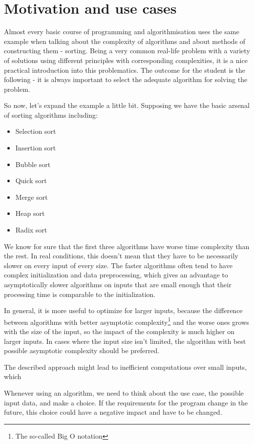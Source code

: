 \chapter{Motivation and use cases}

Almost every basic course of programming and algorithmisation uses the same example when talking about the complexity of algorithms and about methods of constructing them - sorting. Being a very common real-life problem with a variety of solutions using different principles with corresponding complexities, it is a nice practical introduction into this problematics. The outcome for the student is the following - it is always important to select the adequate algorithm for solving the problem.

So now, let's expand the example a little bit. Supposing we have the basic arsenal of sorting algorithms including:

\begin{itemize}
	\item Selection sort
	\item Insertion sort
	\item Bubble sort
	\item Quick sort
	\item Merge sort
	\item Heap sort
	\item Radix sort
\end{itemize}

We know for sure that the first three algorithms have worse time complexity than the rest. In real conditions, this doesn't mean that they have to be necessarily slower on every input of every size. The faster algorithms often tend to have complex initialization and data preprocessing, which gives an advantage to asymptotically slower algorithms on inputs that are small enough that their processing time is comparable to the initialization. 

In general, it is more useful to optimize for larger inputs, because the difference between algorithms with better asymptotic complexity\footnote{The so-called Big O notation} and the worse ones grows with the size of the input, so the impact of the complexity is much higher on larger inputs. In cases where the input size isn't limited, the algorithm with best possible asymptotic complexity should be preferred.

The described approach might lead to inefficient computations over small inputs, which 

Whenever using an algorithm, we need to think about the use case, the possible input data, and make a choice. If the requirements for the program change in the future, this choice could have a negative impact and have to be changed.

